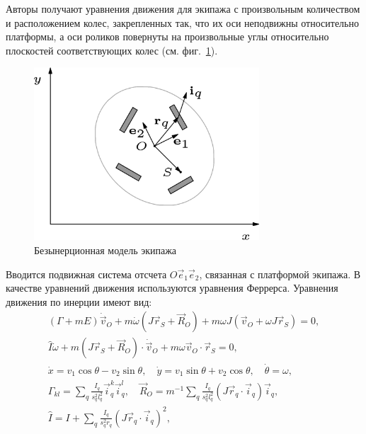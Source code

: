 Авторы \cite{Borisov2011} получают уравнения движения для экипажа с произвольным количеством и расположением колес, закрепленных так, что их оси неподвижны относительно платформы, а оси роликов повернуты на произвольные углы относительно плоскостей соответствующих колес (см. фиг.~\ref{fig:bor_vehicle}).

\begin{figure}[ht!]
    \centering
    \includegraphics[width=0.75\textwidth]{content/pic/asy/cart_bor.png}
    \caption{Безынерционная модель экипажа}
    \label{fig:bor_vehicle}
\end{figure}

Вводится подвижная система отсчета $O\vec{e}_1\vec{e}_2$, связанная с платформой экипажа. В качестве уравнений движения используются уравнения Феррерса. Уравнения движения по инерции имеют вид:
\begin{eqnarray*}
    (\Gamma+mE)\dot{\vec{v}}_O + m\dot{\omega}(J\vec{r}_S+\vec{R}_O)+m\omega J(\vec{v}_O + \omega J\vec{r}_S) = 0,\\
    \hat{I}\dot{\omega} + m(J\vec{r}_S+\vec{R}_O)\cdot\dot{\vec{v}}_O+m\omega\vec{v}_O\cdot\vec{r}_S = 0,\\
    \dot{x} = v_1\cos\theta - v_2\sin\theta, \quad \dot{y} = v_1\sin\theta + v_2\cos\theta, \quad \dot{\theta} = \omega,\\
    \Gamma_{kl} = \sum_q \frac{I_q}{s_q^2 l_q^2}\vec{i}_q^k\vec{i}_q^l, \quad \vec{R}_O = m^{-1}\sum_q \frac{I_q}{s_q^2 l_q^2}(J\vec{r}_q\cdot \vec{i}_q) \vec{i}_q,\\
    \hat{I} = I + \sum_q \frac{I_q}{s_q^2 r_q}(J\vec{r}_q\cdot \vec{i}_q)^2,
\end{eqnarray*}

